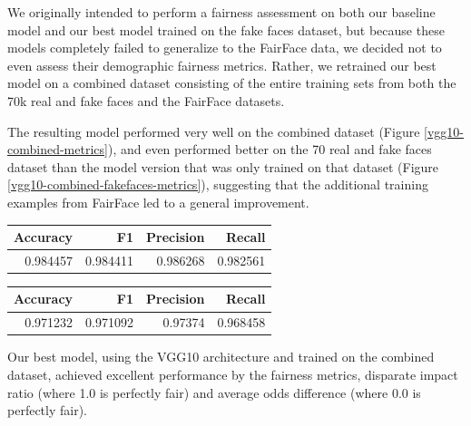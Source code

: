 \documentclass[11pt, letterpaper]{article}
\newenvironment{Figure}
  {\par\medskip\noindent\minipage{\linewidth}}
  {\endminipage\par\medskip}
\begin{document}
\begin{multicols}{2}
  We originally intended to perform a fairness assessment on both our baseline
  model and our best model trained on the fake faces dataset, but because
  these models completely failed to generalize to the FairFace data,
  we decided not to even assess their demographic fairness metrics. Rather, we
  retrained our best model on a combined dataset consisting of the entire
  training sets from both the 70k real and fake faces and the FairFace datasets.

  The resulting model performed very well on the combined dataset (Figure
  \ref{vgg10-combined-metrics}), and even performed better on the 70 real and
  fake faces dataset than the model version that was only trained on that
  dataset (Figure \ref{vgg10-combined-fakefaces-metrics}), suggesting that the
  additional training examples from FairFace led to a general improvement.

  \begin{Figure}
    \centering
    \label{vgg10-combined-metrics}
    \begin{tabular}{rrrr}
    \toprule
    Accuracy &        F1 &  Precision &    Recall \\
    \midrule
    0.984457 &  0.984411 &   0.986268 &  0.982561 \\
    \bottomrule
    \end{tabular}
  \end{Figure}

  \begin{Figure}
    \centering
    \label{vgg10-combined-fakefaces-metrics}
    \begin{tabular}{rrrr}
    \toprule
     Accuracy &        F1 &  Precision &    Recall \\
    \midrule
     0.971232 &  0.971092 &    0.97374 &  0.968458 \\
    \bottomrule
    \end{tabular}
    \end{Figure}

  Our best model, using the VGG10 architecture and trained on the combined
  dataset, achieved excellent performance by the fairness metrics, disparate
  impact ratio (where 1.0 is perfectly fair) and average odds difference
  (where 0.0 is perfectly fair).


\end{multicols}
\end{document}
